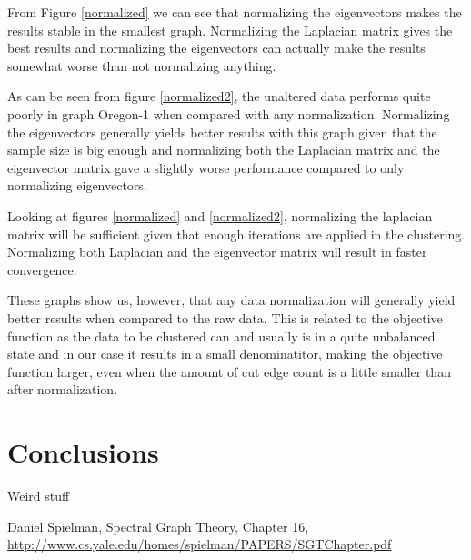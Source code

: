 \documentclass{article}
\begin{document}
From Figure \ref{normalized} we can see that normalizing the eigenvectors
makes the results stable in the smallest graph. Normalizing the Laplacian matrix gives the best results and
normalizing the eigenvectors can actually make the results somewhat worse than
not normalizing anything.

As can be seen from figure \ref{normalized2}, 
the unaltered data performs quite poorly in graph Oregon-1 when compared with any normalization. Normalizing 
the eigenvectors generally yields better results with this graph given that the sample
size is big enough and normalizing both the Laplacian matrix and the eigenvector matrix
gave a slightly worse performance compared to only normalizing eigenvectors. 

Looking at figures \ref{normalized} and \ref{normalized2}, normalizing the laplacian matrix will be sufficient
given that enough iterations are applied in the clustering. Normalizing both Laplacian and the eigenvector
matrix will result in faster convergence.

These graphs show us, however, that any data normalization will generally yield better results when 
compared to the raw data. This is related to the objective function as the data to be clustered
can and usually is in a quite unbalanced state and in our case it results in a small denominatitor, making
the objective function larger, even when the amount of cut edge count is a little smaller than after
normalization.

\clearpage
\section{Conclusions}

Weird stuff



\begin{thebibliography}{99}

 Daniel Spielman, Spectral Graph Theory, Chapter 16,
	\url{http://www.cs.yale.edu/homes/spielman/PAPERS/SGTChapter.pdf}



\end{thebibliography}

\end{document}
